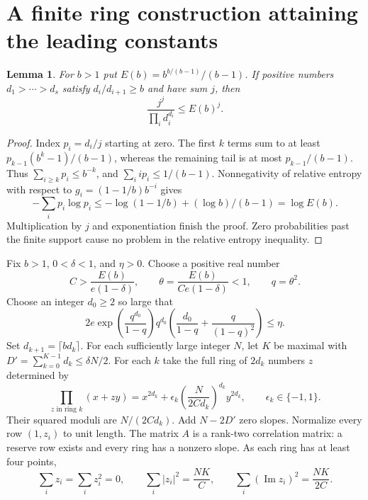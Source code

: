 \documentclass[11pt]{article}
\newtheorem{lemma}[theorem]{Lemma}
\DeclareMathOperator{\Imm}{Im}
\begin{document}
\section{A finite ring construction attaining the leading constants}
\begin{lemma}\label{lem:entropy}
For $b>1$ put $E(b)=b^{b/(b-1)}/(b-1)$. If positive numbers
$d_1>\cdots>d_s$ satisfy $d_i/d_{i+1}\ge b$ and have sum $j$, then
\[
 \frac{j^j}{\prod_i d_i^{d_i}}\le E(b)^j.
\]
\end{lemma}
\begin{proof}
Index $p_i=d_i/j$ starting at zero. The first $k$ terms sum to at least
$p_{k-1}(b^k-1)/(b-1)$, whereas the remaining tail is at most
$p_{k-1}/(b-1)$. Thus $\sum_{i\ge k}p_i\le b^{-k}$, and
$\sum_i i p_i\le1/(b-1)$. Nonnegativity of relative entropy with respect to
$g_i=(1-1/b)b^{-i}$ gives
\[
 -\sum_i p_i\log p_i
 \le-\log(1-1/b)+(\log b)/(b-1)=\log E(b).
\]
Multiplication by $j$ and exponentiation finish the proof. Zero probabilities
past the finite support cause no problem in the relative entropy inequality.
\end{proof}

Fix $b>1$, $0<\delta<1$, and $\eta>0$. Choose a positive real number
\[
 C>\frac{E(b)}{e(1-\delta)},\qquad
 \theta=\frac{E(b)}{Ce(1-\delta)}<1,\qquad q=\theta^2.
\]
Choose an integer $d_0\ge2$ so large that
\begin{equation}\label{eq:d0}
 2e\exp\!\left(\frac{q^{d_0}}{1-q}\right)q^{d_0}
 \left(\frac{d_0}{1-q}+\frac{q}{(1-q)^2}\right)\le\eta.
\end{equation}
Set $d_{k+1}=\lceil bd_k\rceil$. For each sufficiently large integer $N$, let
$K$ be maximal with $D'=\sum_{k=0}^{K-1}d_k\le\delta N/2$.
For each $k$ take the full ring of $2d_k$ numbers $z$ determined by
\begin{equation}\label{eq:ring}
 \prod_{z\text{ in ring }k}(x+zy)
 =x^{2d_k}+\epsilon_k\left(\frac{N}{2Cd_k}\right)^{d_k}y^{2d_k},
 \qquad \epsilon_k\in\{-1,1\}.
\end{equation}
Their squared moduli are $N/(2Cd_k)$. Add $N-2D'$ zero slopes.
Normalize every row $(1,z_i)$ to unit length. The matrix $A$ is a rank-two correlation
matrix: a reserve row exists and every ring has a nonzero slope. As each ring
has at least four points,
\begin{equation}\label{eq:slopes}
 \sum_i z_i=\sum_i z_i^2=0,
 \qquad \sum_i|z_i|^2=\frac{NK}{C},
 \qquad \sum_i(\Imm z_i)^2=\frac{NK}{2C}.
\end{equation}
\end{document}
